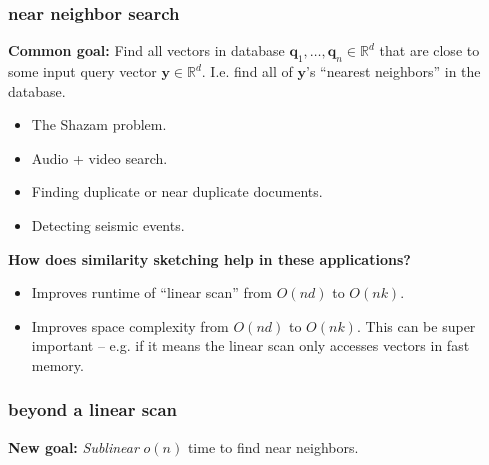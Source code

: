 \documentclass[compress]{beamer}
\newcommand{\bv}[1]{\mathbf{#1}}
\newcommand{\R}{\mathbb{R}}
\begin{document}
\begin{frame}
	\frametitle{near neighbor search}
	\textbf{Common goal:} Find all vectors in database $\bv{q}_1, \ldots, \bv{q}_n \in \R^d$ that are close to some input query vector $\bv{y}\in \R^d$. I.e. find all of $\bv{y}$'s ``nearest neighbors'' in the database.
	\begin{itemize}
		\item The Shazam problem.
		\item Audio + video search.
		\item Finding duplicate or near duplicate documents.
		\item Detecting seismic events.
	\end{itemize}

		\begin{center}
	\textbf{\alert{How does similarity sketching help in these applications?}}
		\end{center}
	\begin{itemize}
		\item Improves runtime of ``linear scan'' from $O(nd)$ to $O(nk)$.
		\item Improves space complexity from $O(nd)$ to $O(nk)$. This can be super important -- e.g. if it means the linear scan only accesses vectors in fast memory.
	\end{itemize}
\end{frame}

\begin{frame}
	\frametitle{beyond a linear scan}
	\begin{center}
		\textbf{New goal:} \emph{Sublinear} $o(n)$ time to find near neighbors. 
	\end{center}
\end{frame}
\end{document}
